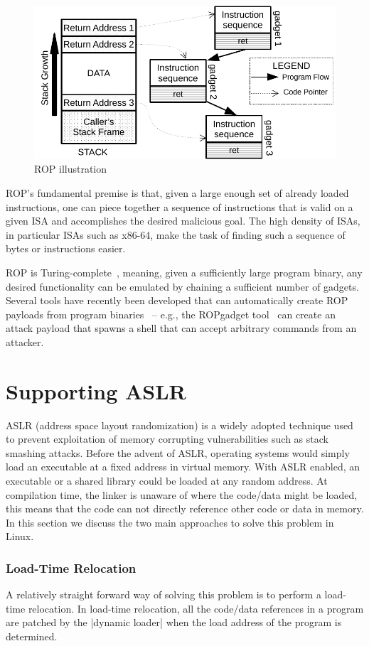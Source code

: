 \begin{figure}[ht!]
\centering
\includegraphics[width=0.65\columnwidth]{pictures/rop-min.pdf}
\caption{ROP illustration}
\label{fig:rop_ex}
\end{figure}

ROP's fundamental premise is that, given a large enough set of already loaded instructions, one can piece together a sequence of instructions that is  valid on a given ISA and accomplishes the desired malicious goal. The high density of ISAs, in particular ISAs such as x86-64, make the task of finding such a sequence of bytes or instructions easier. 

ROP is Turing-complete~\cite{Buchanan:2008:GIG:1455770.1455776}, meaning, given a sufficiently large program binary, any desired functionality can be emulated by chaining a sufficient number of gadgets. Several tools have recently been developed that can automatically create ROP payloads from program
binaries~\cite{ROPCOMPILER} -- e.g., the ROPgadget tool~\cite{ropgadget} can create an attack payload that spawns a shell that can accept arbitrary commands from an attacker.


\section{Supporting ASLR}
\label{sec:bg:aslr}
ASLR (address space layout randomization) is a widely adopted technique used to prevent exploitation of memory corrupting vulnerabilities such as stack smashing attacks. Before the advent of ASLR, operating systems would simply load an executable at a fixed address in virtual memory. With ASLR enabled, an executable or a shared library could be loaded at any random address.
At compilation time, the linker is unaware of where the code/data might be loaded, this means that the code can not directly reference other code or data in memory. In this section we discuss the two main approaches to solve this problem in Linux.

\subsubsection*{Load-Time Relocation}
A relatively straight forward way of solving this problem is to perform a load-time relocation. In load-time relocation, all the code/data references in a program are patched by the |dynamic loader| when the load address of the program is determined.

